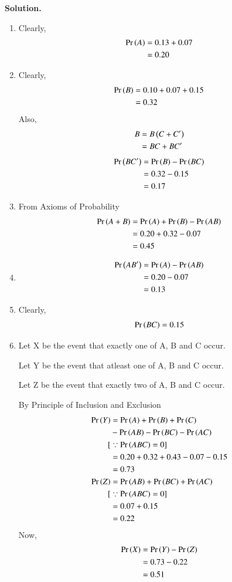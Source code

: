 \documentclass[journal,12pt,twocolumn]{IEEEtran}
\begin{document}
\textbf{Solution.}
\begin{enumerate}[label=(\alph*)]
\item 
Clearly,
\begin{align}
\Pr\left(A\right) &= 0.13 + 0.07\\
       &= 0.20
\end{align}
\item 
Clearly,
\begin{align}
\label{eq:1}
    \Pr\left(B\right) &= 0.10 + 0.07 + 0.15\\
       &= 0.32
\end{align}
Also,
\begin{align}
B &= B \left(C+C^{\prime}\right)\\
  &=  BC + BC^{\prime}
\end{align}
\begin{align}
    \Pr\left(BC^\prime\right) &= \Pr\left(B\right) - \Pr\left(BC\right) \\
    &= 0.32 - 0.15\\
    &= 0.17
\end{align}
\item 
From Axioms of Probability
\begin{align}
    \Pr\left(A + B\right) &= \Pr\left(A\right) + \Pr\left(B\right) - \Pr\left(AB\right)\\
    &= 0.20 + 0.32 - 0.07\\
    &= 0.45
\end{align}
\item 
\begin{align}
    \Pr\left(AB^\prime\right) &= \Pr\left(A\right) - \Pr\left(AB\right) \\
    &= 0.20 - 0.07\\
    &= 0.13
\end{align}
\item 
Clearly,
\begin{align}
    \Pr\left(BC\right) = 0.15
\end{align}
\item 
Let X be the event that exactly one of A, B and C occur.

Let Y be the event that atleast one of A, B and C occur.

Let Z be the event that exactly two of A, B and C occur.

By Principle of Inclusion and Exclusion
\begin{align}   
    \pr{Y} &= \pr{A} + \pr{B} + \pr{C}\\ &- \pr{AB} - \pr{BC} - \pr{AC}\nonumber\\
    [&\because \pr{ABC} =0]\\
    &= 0.20+0.32+0.43-0.07-0.15\\
    &= 0.73\\
    \pr{Z} &= \pr{AB} + \pr{BC} + \pr{AC}\\
    [&\because \pr{ABC} =0]\\
    &= 0.07+0.15\\
    &= 0.22
\end{align}
Now,
\begin{align}
    \Pr\left(X\right) &= \Pr\left(Y\right)-\Pr\left(Z\right)\\
    &= 0.73-0.22\\
    &=0.51
\end{align}
\end{enumerate}
\end{document}
